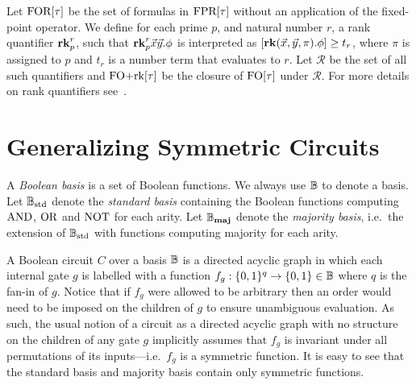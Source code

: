 \documentclass[a4paper,UKenglish]{lipics-v2018}
\begin{document}
Let $\text{\upshape FOR}[\tau]$ be the set of formulas in $\text{\upshape FPR}[\tau]$ without an application
of the fixed-point operator. We define for each prime $p$, and natural number
$r$, a rank quantifier $\text{\textbf{rk}}^r_p$, such that $\text{\textbf{rk}}^r_p\vec{x}\vec{y}. \phi$ is
interpreted as $[\text{\textbf{rk}} (\vec{x}, \vec{y}, \pi) . \phi] \geq t_r$, where $\pi$ is
assigned to $p$ and $t_r$ is a number term that evaluates to $r$. Let
$\mathcal{R}$ be the set of all such quantifiers and $\text{\upshape FO+rk}[\tau]$ be the
closure of $\text{\upshape FO}[\tau]$ under $\mathcal{R}$. For more details on rank quantifiers
see~\cite{Dawar09logicswith}.


\section{Generalizing Symmetric Circuits}\label{sec:symm-circ}
A \emph{Boolean basis} is a set of Boolean functions. We always use $\mathbb{B}$ to
denote a basis. Let $\mathbb{B}_{\text{std}}$ denote the \emph{standard basis} containing the
Boolean functions computing $\text{\upshape AND}$, $\text{\upshape OR}$ and $\text{\upshape NOT}$ for each arity. Let $\mathbb{B}_{\text{\textbf{maj}}}$
denote the \emph{majority basis}, i.e.\ the extension of $\mathbb{B}_{\text{std}}$ with functions
computing majority for each arity.

A Boolean circuit $C$ over a basis $\mathbb{B}$ is a directed acyclic graph in which
each internal gate $g$ is labelled with a function $f_g : \{0,1\}^q \rightarrow \{0,1\}
\in \mathbb{B}$ where $q$ is the fan-in of $g$. Notice that if $f_g$ were allowed to be
arbitrary then an order would need to be imposed on the children of $g$ to
ensure unambiguous evaluation. As such, the usual notion of a circuit as a
directed acyclic graph with no structure on the children of any gate $g$
implicitly assumes that $f_g$ is invariant under all permutations of its
inputs---i.e.\ $f_g$ is a symmetric function. It is easy to see that the
standard basis and majority basis contain only symmetric functions.
\end{document}
